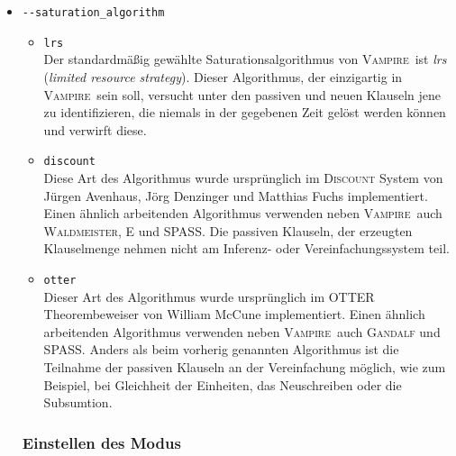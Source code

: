 \documentclass{article}
\newcommand{\vampire}{\textsc{Vampire}~}
\begin{document}
\begin{itemize}
\item \verb|--saturation_algorithm| \label{arg:saturationalgorithm}
\begin{itemize}
	\item \verb|lrs|\\
	Der standardmäßig gewählte Saturationsalgorithmus von \vampire ist \emph{lrs} (\emph{limited resource strategy}).
	Dieser Algorithmus, der einzigartig in \vampire sein soll, versucht unter den passiven und neuen Klauseln jene zu identifizieren, die niemals in der gegebenen Zeit gelöst werden können und verwirft diese. \cite{riazanov2003limited}
	\item \verb|discount|\\
	Diese Art des Algorithmus wurde ursprünglich im \textsc{Discount} System von Jürgen Avenhaus, Jörg Denzinger und Matthias Fuchs implementiert.
	Einen ähnlich arbeitenden Algorithmus verwenden neben \vampire auch \textsc{Waldmeister}, \textsc{E} und \textsc{SPASS}. 
	Die passiven Klauseln, der erzeugten Klauselmenge nehmen nicht am Inferenz- oder Vereinfachungssystem teil. \cite{riazanov2003limited} 
	\item \verb|otter|\\
	Dieser Art des Algorithmus wurde ursprünglich im OTTER Theorembeweiser von William McCune implementiert.
	Einen ähnlich arbeitenden Algorithmus verwenden neben \vampire auch \textsc{Gandalf} und \textsc{SPASS}. 
	Anders als beim vorherig genannten Algorithmus ist die Teilnahme der passiven Klauseln an der Vereinfachung möglich, wie zum Beispiel, bei Gleichheit der Einheiten, das Neuschreiben oder die Subsumtion. \cite{riazanov2003limited} 
\end{itemize}

	\subsubsection{Einstellen des Modus}


\end{itemize}
\end{document}
